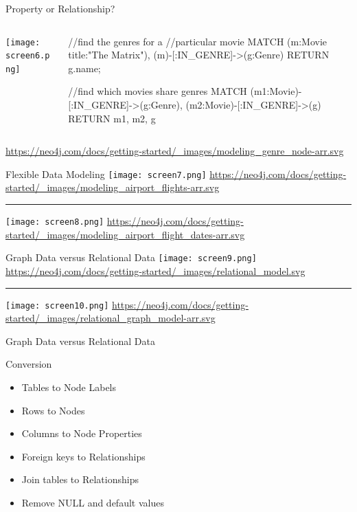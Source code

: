 \documentclass[ignorenonframetext,xcolor=x11names]{beamer}
\begin{document}
\begin{frame}[fragile]{Property or Relationship?}
\begin{columns}
\begin{column}{.35\textwidth}
\texttt{[image: screen6.png]}
\end{column}
\begin{column}{.65\textwidth}
\scriptsize
\begin{cyphercode}
//find the genres for a 
//particular movie
MATCH (m:Movie {title:"The Matrix"}),
      (m)-[:IN_GENRE]->(g:Genre)
RETURN g.name;

//find which movies share genres
MATCH (m1:Movie)-[:IN_GENRE]->(g:Genre),
      (m2:Movie)-[:IN_GENRE]->(g)
RETURN m1, m2, g
\end{cyphercode}
\end{column}
\end{columns}
\tiny{\url{https://neo4j.com/docs/getting-started/\_images/modeling\_genre\_node-arr.svg}}
\end{frame}

\begin{frame}{Flexible Data Modeling}
\centering
\texttt{[image: screen7.png]}
\tiny{\url{https://neo4j.com/docs/getting-started/_images/modeling_airport_flights-arr.svg}} \hrule
\texttt{[image: screen8.png]}
\tiny{\url{https://neo4j.com/docs/getting-started/_images/modeling_airport_flight_dates-arr.svg}}
\end{frame}

\begin{frame}{Graph Data versus Relational Data}
\centering
\texttt{[image: screen9.png]}
\tiny{\url{https://neo4j.com/docs/getting-started/_images/relational_model.svg}} \hrule
\texttt{[image: screen10.png]}
\tiny{\url{https://neo4j.com/docs/getting-started/_images/relational_graph_model-arr.svg}}
\end{frame}

\begin{frame}{Graph Data versus Relational Data}
\begin{block}{Conversion}
\begin{itemize}
  \item Tables to Node Labels
  \item Rows to Nodes
  \item Columns to Node Properties
  \item Foreign keys to Relationships
  \item Join tables to Relationships
  \item Remove NULL and default values
\end{itemize}
\end{block}
\end{frame}
\end{document}
